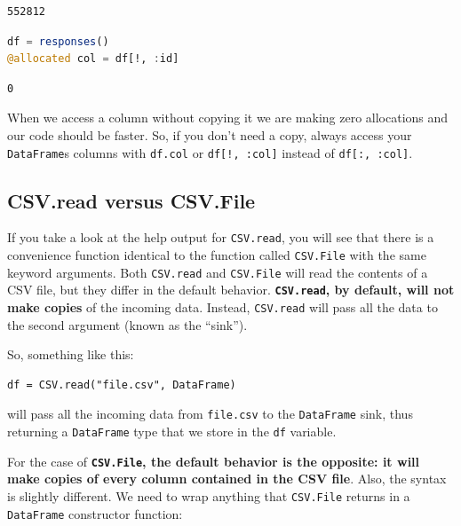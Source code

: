 \documentclass[
  notoc %
]{tufte-book}
\newcommand{\passthrough}[1]{#1}
\begin{document}
\begin{lstlisting}
552812
\end{lstlisting}

\begin{lstlisting}[language=Julia]
df = responses()
@allocated col = df[!, :id]
\end{lstlisting}

\begin{lstlisting}
0
\end{lstlisting}

When we access a column without copying it we are making zero
allocations and our code should be faster. So, if you don't need a copy,
always access your \passthrough{\lstinline!DataFrame!}s columns with
\passthrough{\lstinline!df.col!} or
\passthrough{\lstinline"df[!, :col]"} instead of
\passthrough{\lstinline!df[:, :col]!}.

\hypertarget{sec:df_performance_csv_read_file}{%
\subsection{CSV.read versus
CSV.File}\label{sec:df_performance_csv_read_file}}

If you take a look at the help output for
\passthrough{\lstinline!CSV.read!}, you will see that there is a
convenience function identical to the function called
\passthrough{\lstinline!CSV.File!} with the same keyword arguments. Both
\passthrough{\lstinline!CSV.read!} and
\passthrough{\lstinline!CSV.File!} will read the contents of a CSV file,
but they differ in the default behavior.
\textbf{\passthrough{\lstinline!CSV.read!}, by default, will not make
copies} of the incoming data. Instead,
\passthrough{\lstinline!CSV.read!} will pass all the data to the second
argument (known as the ``sink'').

So, something like this:

\begin{lstlisting}
df = CSV.read("file.csv", DataFrame)
\end{lstlisting}

will pass all the incoming data from \passthrough{\lstinline!file.csv!}
to the \passthrough{\lstinline!DataFrame!} sink, thus returning a
\passthrough{\lstinline!DataFrame!} type that we store in the
\passthrough{\lstinline!df!} variable.

For the case of \textbf{\passthrough{\lstinline!CSV.File!}, the default
behavior is the opposite: it will make copies of every column contained
in the CSV file}. Also, the syntax is slightly different. We need to
wrap anything that \passthrough{\lstinline!CSV.File!} returns in a
\passthrough{\lstinline!DataFrame!} constructor function:
\end{document}
